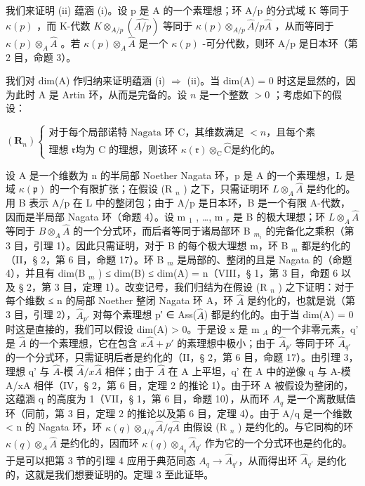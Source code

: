 我们来证明 (ii) 蕴涵 (i)。设 p 是 A 的一个素理想；环 A/p 的分式域 K 等同于 \(\kappa(p)\) ，而 K-代数 \(K \otimes_{A/p} (\widehat{A/p})\) 等同于 \(\kappa(p) \otimes_{A/p} \widehat{A}/p\widehat{A}\) ，从而等同于 \(\kappa(p) \otimes_{A} \widehat{A}\) 。若 \(\kappa(p) \otimes_{A} \widehat{A}\) 是一个 \(\kappa(p)\) -可分代数，则环 A/p 是日本环（第 2 目，命题 3）。

我们对 dim(A) 作归纳来证明蕴涵 (i) \(\Rightarrow\) (ii)。当 dim(A) = 0 时这是显然的，因为此时 A 是 Artin 环，从而是完备的。设 \(n\) 是一个整数 \(>0\) ；考虑如下的假设：

\((\mathbf{R}_n)\left\{
\begin{array}{ll}\text{对于每个局部诺特 Nagata 环 C，其维数满足 } < n\text{，且每个素}\\ \text{理想 } \mathfrak{r}\text{均为 C 的理想，则该环 }\kappa(\mathfrak{r})\otimes_{\mathrm{C}}\hat{\mathrm{C}}\text{是约化的。} \end{array}
\right.\)

设 A 是一个维数为 n 的半局部 Noether Nagata 环，p 是 A 的一个素理想，L 是域 \(\kappa(\mathfrak{p})\) 的一个有限扩张；在假设 (R \(_{n}\) ) 之下，只需证明环 \(L \otimes_{A} \hat{A}\) 是约化的。用 B 表示 A/p 在 L 中的整闭包；由于 A/p 是日本环，B 是一个有限 A-代数，因而是半局部 Nagata 环（命题 4）。设 m \(_{1}\) , \ldots, m \(_{r}\) 是 B 的极大理想；环 \(L \otimes_{A} \hat{A}\) 等同于 \(B \otimes_{A} \hat{A}\) 的一个分式环，而后者等同于诸局部环 B \(_{m_{i}}\) 的完备化之乘积（第 3 目，引理 1）。因此只需证明，对于 B 的每个极大理想 m，环 B \(_{m}\) 都是约化的（II，§ 2，第 6 目，命题 17）。环 B \(_{m}\) 是局部的、整闭的且是 Nagata 的（命题 4），并且有 dim(B \(_{m}\) ) ≤ dim(B) ≤ dim(A) = n（VIII，§ 1，第 3 目，命题 6 以及 § 2，第 3 目，定理 1）。改变记号，我们归结为在假设 (R \(_{n}\) ) 之下证明：对于每个维数 ≤ n 的局部 Noether 整闭 Nagata 环 A，环 \(\hat{A}\) 是约化的，也就是说（第 3 目，引理 2），\(\hat{A}_{p'}\) 对每个素理想 p′ ∈ Ass(\(\hat{A}\)) 都是约化的。由于当 dim(A) = 0 时这是直接的，我们可以假设 dim(A) > 0。于是设 x 是 m \(_{A}\) 的一个非零元素，q' 是 \(\hat{A}\) 的一个素理想，它在包含 \(x\hat{A} + p'\) 的素理想中极小；由于 \(\hat{A}_{p'}\) 等同于环 \(\hat{A}_{q'}\) 的一个分式环，只需证明后者是约化的（II，§ 2，第 6 目，命题 17）。由引理 3，理想 q' 与 \(\hat{A}\)-模 \(\hat{A}/x\hat{A}\) 相伴；由于 \(\hat{A}\) 在 A 上平坦，q' 在 A 中的逆像 q 与 A-模 A/xA 相伴（IV，§ 2，第 6 目，定理 2 的推论 1）。由于环 A 被假设为整闭的，这蕴涵 q 的高度为 1（VII，§ 1，第 6 目，命题 10），从而环 \(A_{q}\) 是一个离散赋值环（同前，第 3 目，定理 2 的推论以及第 6 目，定理 4）。由于 A/q 是一个维数 < n 的 Nagata 环，环 \(\kappa(q) \otimes_{A/q} \hat{A}/q\hat{A}\) 由假设 (R \(_{n}\) ) 是约化的。与它同构的环 \(\kappa(q) \otimes_{A} \hat{A}\) 是约化的，因而环 \(\kappa(q) \otimes_{A_{q}} \hat{A}_{q'}\) 作为它的一个分式环也是约化的。于是可以把第 3 节的引理 4 应用于典范同态 \(A_{q} \to \hat{A}_{q'}\)，从而得出环 \(\hat{A}_{q'}\) 是约化的，这就是我们想要证明的。定理 3 至此证毕。

